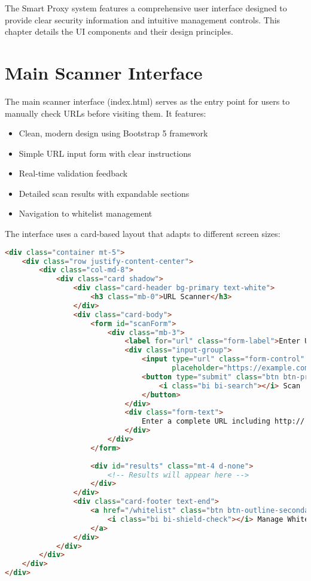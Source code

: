 The Smart Proxy system features a comprehensive user interface designed to provide clear security information and intuitive management controls. This chapter details the UI components and their design principles.

\section{Main Scanner Interface}

The main scanner interface (index.html) serves as the entry point for users to manually check URLs before visiting them. It features:

\begin{itemize}
    \item Clean, modern design using Bootstrap 5 framework
    \item Simple URL input form with clear instructions
    \item Real-time validation feedback
    \item Detailed scan results with expandable sections
    \item Navigation to whitelist management
\end{itemize}

The interface uses a card-based layout that adapts to different screen sizes:

\begin{lstlisting}[language=HTML, caption=Main Scanner Interface]
<div class="container mt-5">
    <div class="row justify-content-center">
        <div class="col-md-8">
            <div class="card shadow">
                <div class="card-header bg-primary text-white">
                    <h3 class="mb-0">URL Scanner</h3>
                </div>
                <div class="card-body">
                    <form id="scanForm">
                        <div class="mb-3">
                            <label for="url" class="form-label">Enter URL to scan:</label>
                            <div class="input-group">
                                <input type="url" class="form-control" id="url" 
                                       placeholder="https://example.com" required>
                                <button type="submit" class="btn btn-primary">
                                    <i class="bi bi-search"></i> Scan
                                </button>
                            </div>
                            <div class="form-text">
                                Enter a complete URL including http:// or https://
                            </div>
                        </div>
                    </form>
                    
                    <div id="results" class="mt-4 d-none">
                        <!-- Results will appear here -->
                    </div>
                </div>
                <div class="card-footer text-end">
                    <a href="/whitelist" class="btn btn-outline-secondary btn-sm">
                        <i class="bi bi-shield-check"></i> Manage Whitelist
                    </a>
                </div>
            </div>
        </div>
    </div>
</div>
\end{lstlisting}

